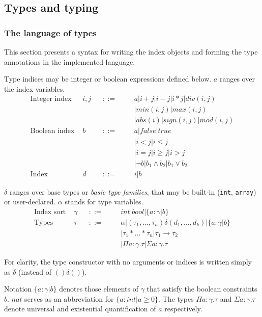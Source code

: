 \documentclass[a4paper,UKenglish]{lipics-v2016}
\begin{document}
\subsection{Types and typing}

\subsubsection{The language of types}
This section presents a syntax for writing the index objects and forming the
type annotations in the implemented language.

Type indices may be integer or boolean expressions defined below.
$a$ ranges over the index variables.
\begin{align*}
  \text{Integer index } & i,j &&::= &&& a|i+j|i-j|i*j|div(i,j)\\
                &     &&    &&& |min(i,j)|max(i,j)\\
                &     &&    &&& |abs(i)|sign(i,j)|mod(i,j)\\
  \text{Boolean index } & b &&::= &&& a|false|true\\
                &     &&    &&& |i < j | i \leq j \\
                &     &&    &&& |i = j|i \geq j | i > j\\
                &     &&    &&& |\neg b| b_1 \land b_2 | b_1 \lor b_2\\
  \text{Index } & d &&::= &&& i|b
\end{align*}

$\delta$ ranges over base types or \emph{basic type families}, that may be built-in
(\texttt{int}, \texttt{array}) or user-declared. $\alpha$ stands for type variables.
\begin{align*}
  \text{Index sort } & \gamma &&::= &&& int | bool | \{ a: \gamma | b \}\\
  \text{Types } & \tau &&::= &&& \alpha | (\tau_1, \dots, \tau_n)\delta (d_1, \dots, d_k) | \{ a: \gamma | b \}\\
                &      &&    &&& | \tau_1 * \dots * \tau_n | \tau_1 \to \tau_2\\
                &      &&    &&& | \Pi a: \gamma. \tau | \Sigma a: \gamma. \tau
\end{align*}

For clarity, the type constructor with no arguments or indices is written
simply as $\delta$ (instead of $()\delta()$).

Notation $\{ a: \gamma | b \}$ denotes those elements of $\gamma$ that satisfy
the boolean constraints $b$.  $nat$ serves as an abbreviation for $\{ a: int |
a \geq 0 \}$. The types $\Pi a: \gamma. \tau$ and $\Sigma a: \gamma. \tau$
denote universal and existential quantification of $a$ respectively.
\end{document}
